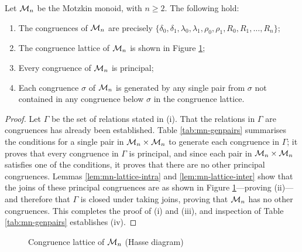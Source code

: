 \begin{theorem}
  \label{thm:mn-congs}
  Let $\Mot_n$ be the Motzkin monoid, with $n \geq 2$.  The following hold:
  \begin{enumerate}[\rm(i)]
  \item The congruences of $\Mot_n$ are precisely
    $\{\delta_0, \delta_1, \lambda_0, \lambda_1, \rho_0, \rho_1, R_0, R_1,
    \ldots, R_n\}$;
  \item The congruence lattice of $\Mot_n$ is shown in Figure
    \ref{fig:mn-cong-lattice};
  \item Every congruence of $\Mot_n$ is principal;
  \item Each congruence $\sigma$ of $\Mot_n$ is generated by any single pair
    from $\sigma$ not contained in any congruence below $\sigma$ in the
    congruence lattice.
  \end{enumerate}
  \begin{proof}
    Let $\Gamma$ be the set of relations stated in (i).  That the relations in
    $\Gamma$ are congruences has already been established.  Table
    \ref{tab:mn-genpairs} summarises the conditions for a single pair in
    $\mathcal{M}_n \times \mathcal{M}_n$ to generate each congruence in $\Gamma$; it proves
    that every congruence in $\Gamma$ is principal, and since each pair in
    $\mathcal{M}_n \times \mathcal{M}_n$ satisfies one of the conditions, it proves that there
    are no other principal congruences.  Lemmas \ref{lem:mn-lattice-intra} and
    \ref{lem:mn-lattice-inter} show that the joins of these principal
    congruences are as shown in Figure \ref{fig:mn-cong-lattice}---proving
    (ii)---and therefore that $\Gamma$ is closed under taking joins, proving
    that $\Mot_n$ has no other congruences.  This completes the proof of (i) and
    (iii), and inspection of Table \ref{tab:mn-genpairs} establishes (iv).
  \end{proof}
\end{theorem}

\begin{figure}[h]
  \centering
  \caption[Congruence lattice of $\Mot_n$]{Congruence lattice of $\Mot_n$ (Hasse diagram)}
  \label{fig:mn-cong-lattice}
\end{figure}

